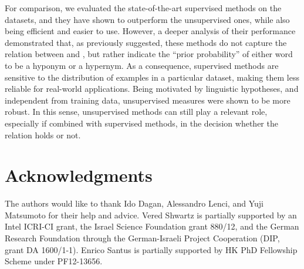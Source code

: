 \documentclass[11pt]{article}
\begin{document}
For comparison, we evaluated the state-of-the-art supervised methods on the datasets, and they have shown to outperform the unsupervised ones, while also being efficient and easier to use. However, a deeper analysis of their performance demonstrated that, as previously suggested, these methods do not capture the relation between  and , but rather indicate the ``prior probability'' of either word to be a hyponym or a hypernym. As a consequence, supervised methods are sensitive to the distribution of examples in a particular dataset, making them less reliable for real-world applications. Being motivated by linguistic hypotheses, and independent from training data, unsupervised measures were shown to be more robust. In this sense, unsupervised methods can still play a relevant role, especially if combined with supervised methods, in the decision whether the relation holds or not.



\section*{Acknowledgments}

The authors would like to thank Ido Dagan, Alessandro Lenci, and Yuji Matsumoto for their help and advice.
Vered Shwartz is partially supported by an Intel ICRI-CI grant, the Israel Science Foundation grant 880/12, and the German Research Foundation through the German-Israeli Project Cooperation (DIP, grant DA 1600/1-1).
Enrico Santus is partially supported by HK PhD Fellowship Scheme under PF12-13656.




\end{document}
